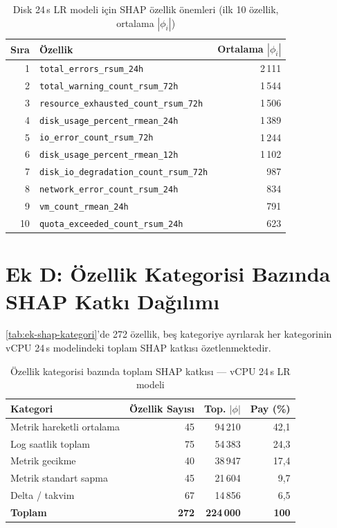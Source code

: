 \begin{ekler}
\begin{table}[htbp]
    \centering
    \caption{Disk 24\,s LR modeli için SHAP özellik önemleri (ilk 10 özellik, ortalama $|\phi_i|$)}
    \label{tab:ek-shap-disk}
    \begin{tabular}{rlr}
        \textbf{Sıra} & \textbf{Özellik} & \textbf{Ortalama $|\phi_i|$} \\
        \hline
        1  & \texttt{total\_errors\_rsum\_24h}                &  2\,111 \\
        2  & \texttt{total\_warning\_count\_rsum\_72h}        &  1\,544 \\
        3  & \texttt{resource\_exhausted\_count\_rsum\_72h}   &  1\,506 \\
        4  & \texttt{disk\_usage\_percent\_rmean\_24h}        &  1\,389 \\
        5  & \texttt{io\_error\_count\_rsum\_72h}             &  1\,244 \\
        6  & \texttt{disk\_usage\_percent\_rmean\_12h}        &  1\,102 \\
        7  & \texttt{disk\_io\_degradation\_count\_rsum\_72h} &    987 \\
        8  & \texttt{network\_error\_count\_rsum\_24h}        &    834 \\
        9  & \texttt{vm\_count\_rmean\_24h}                   &    791 \\
        10 & \texttt{quota\_exceeded\_count\_rsum\_24h}       &    623 \\
    \end{tabular}
\end{table}


\section*{Ek D: Özellik Kategorisi Bazında SHAP Katkı Dağılımı}

\autoref{tab:ek-shap-kategori}'de 272 özellik, beş kategoriye ayrılarak her kategorinin vCPU 24\,s modelindeki toplam SHAP katkısı özetlenmektedir.

\begin{table}[htbp]
    \centering
    \caption{Özellik kategorisi bazında toplam SHAP katkısı — vCPU 24\,s LR modeli}
    \label{tab:ek-shap-kategori}
    \begin{tabular}{lrrr}
        \textbf{Kategori} & \textbf{Özellik Sayısı} & \textbf{Top. $|\phi|$} & \textbf{Pay (\%)} \\
        \hline
        Metrik hareketli ortalama  & 45 & 94\,210 & 42{,}1 \\
        Log saatlik toplam         & 75 & 54\,383 & 24{,}3 \\
        Metrik gecikme             & 40 & 38\,947 & 17{,}4 \\
        Metrik standart sapma      & 45 & 21\,604 &  9{,}7 \\
        Delta / takvim             & 67 & 14\,856 &  6{,}5 \\
        \hline
        \textbf{Toplam}            & \textbf{272} & \textbf{224\,000} & \textbf{100} \\
    \end{tabular}
\end{table}


\end{ekler}
